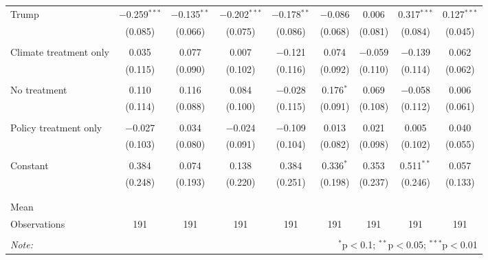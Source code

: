 \begin{tabular}{@{\extracolsep{5pt}}lcccccccc}
 Trump & $-$0.259$^{***}$ & $-$0.135$^{**}$ & $-$0.202$^{***}$ & $-$0.178$^{**}$ & $-$0.086 & 0.006 & 0.317$^{***}$ & 0.127$^{***}$ \\ 
  & (0.085) & (0.066) & (0.075) & (0.086) & (0.068) & (0.081) & (0.084) & (0.045) \\ 
  & & & & & & & & \\ 
 Climate treatment only & 0.035 & 0.077 & 0.007 & $-$0.121 & 0.074 & $-$0.059 & $-$0.139 & 0.062 \\ 
  & (0.115) & (0.090) & (0.102) & (0.116) & (0.092) & (0.110) & (0.114) & (0.062) \\ 
  & & & & & & & & \\ 
 No treatment & 0.110 & 0.116 & 0.084 & $-$0.028 & 0.176$^{*}$ & 0.069 & $-$0.058 & 0.006 \\ 
  & (0.114) & (0.088) & (0.100) & (0.115) & (0.091) & (0.108) & (0.112) & (0.061) \\ 
  & & & & & & & & \\ 
 Policy treatment only & $-$0.027 & 0.034 & $-$0.024 & $-$0.109 & 0.013 & 0.021 & 0.005 & 0.040 \\ 
  & (0.103) & (0.080) & (0.091) & (0.104) & (0.082) & (0.098) & (0.102) & (0.055) \\ 
  & & & & & & & & \\ 
 Constant & 0.384 & 0.074 & 0.138 & 0.384 & 0.336$^{*}$ & 0.353 & 0.511$^{**}$ & 0.057 \\ 
  & (0.248) & (0.193) & (0.220) & (0.251) & (0.198) & (0.237) & (0.246) & (0.133) \\ 
  & & & & & & & & \\ 
\hline \\[-1.8ex] 
Mean &  &  &  &  &  &  &  &  \\ 
Observations & 191 & 191 & 191 & 191 & 191 & 191 & 191 & 191 \\ 
\hline 
\hline \\[-1.8ex] 
\textit{Note:}  & \multicolumn{8}{r}{$^{*}$p$<$0.1; $^{**}$p$<$0.05; $^{***}$p$<$0.01} \\ 
\end{tabular} 
